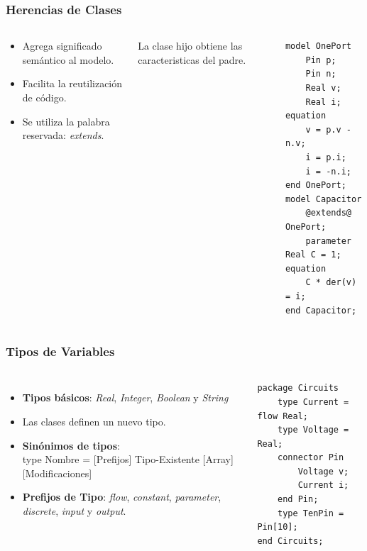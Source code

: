 \documentclass[aspectratio=169,10pt]{beamer}
\begin{document}
\begin{frame}[fragile]
\frametitle{Herencias de Clases} 
\begin{columns}  
\column[t]{8cm}  

\begin{block}{}
\begin{itemize}
    \item Agrega significado semántico al modelo.
    \item Facilita la reutilización de código.
    \item Se utiliza la palabra reservada: \textit{extends}.
\end{itemize} 
\end{block}

\begin{block}{}
La clase hijo obtiene las caracteristicas del padre.
\end{block}

\column[t]{5cm}  
\begin{lstlisting}[style=base]
model OnePort
    Pin p;
    Pin n;
    Real v;
    Real i;
equation
    v = p.v - n.v;
    i = p.i;
    i = -n.i;
end OnePort;
model Capacitor
    @extends@ OnePort;
    parameter Real C = 1;
equation
    C * der(v) = i;
end Capacitor;
\end{lstlisting}
\end{columns}
\end{frame}

\begin{frame}[fragile]
\frametitle{Tipos de Variables} 
\begin{columns}  
\column[t]{9cm}
    \begin{itemize}
        \item \textbf{Tipos básicos}: \textit{Real}, \textit{Integer}, \textit{Boolean} y \textit{String}
        \item Las clases definen un nuevo tipo.
        \item \textbf{Sinónimos de tipos}: \\ 
              type Nombre = [Prefijos] Tipo-Existente [Array] [Modificaciones]
        \item \textbf{Prefijos de Tipo}: \textit{flow}, \textit{constant}, \textit{parameter}, \textit{discrete}, \textit{input} y \textit{output}.
    \end{itemize} 

\column[t]{5cm}
\begin{lstlisting}[style=base]
package Circuits
    type Current = flow Real;
    type Voltage = Real;
    connector Pin
        Voltage v;
        Current i;
    end Pin;
    type TenPin = Pin[10];
end Circuits;
\end{lstlisting}
\par
\end{columns}
\end{frame}
\end{document}
